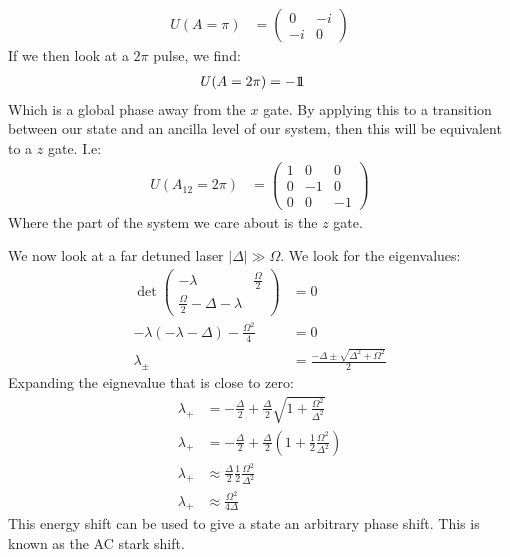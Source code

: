 \begin{align*}
	U(A=\pi) &= \begin{pmatrix}
		0 & -i \\
		-i & 0
		    \end{pmatrix}
\end{align*}
If we then look at a $2\pi$ pulse, we find:
\begin{align*}
	U(A=2\pi) &= -1\!\!1
\end{align*}
Which is a global phase away from the $x$ gate.
By applying this to a transition between our state and an ancilla level of our system, then this will be equivalent to a $z$ gate. I.e:
\begin{align*}
	U(A_{12}=2\pi) &= \begin{pmatrix}
		1 & 0 & 0 \\
		0 & -1 & 0 \\
		0 & 0 & -1
			       \end{pmatrix}
\end{align*}
Where the part of the system we care about is the $z$ gate.

We now look at a far detuned laser $|\Delta| \gg \Omega$. We look for the eigenvalues:
\begin{align*}
	\det \begin{pmatrix}
		-\lambda & \frac{\Omega}{2} \\
		\frac{\Omega}{2} -\Delta -\lambda
	     \end{pmatrix} &= 0 \\
	     -\lambda(-\lambda -\Delta) -\frac{\Omega^2}{4} &= 0 \\
	     \lambda_\pm &= \frac{-\Delta \pm \sqrt{\Delta^2 + \Omega^2}}{2}
\end{align*}
Expanding the eignevalue that is close to zero:
\begin{align*}
	\lambda_+ &=-\frac{\Delta}{2} + \frac{\Delta}{2} \sqrt{1 + \frac{\Omega^2}{\Delta^2}} \\
	\lambda_+ &=-\frac{\Delta}{2} + \frac{\Delta}{2} \left(1 + \frac{1}{2}\frac{\Omega^2}{\Delta^2}\right) \\
	\lambda_+ &\approx\frac{\Delta}{2}\frac{1}{2}\frac{\Omega^2}{\Delta^2} \\
	\lambda_+ &\approx\frac{\Omega^2}{4\Delta}
\end{align*}
This energy shift can be used to give a state an arbitrary phase shift. This is known as the AC stark shift.

